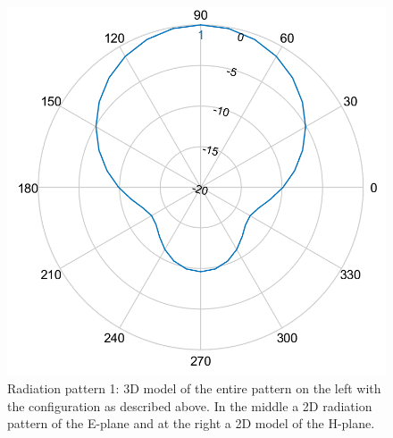 \begin{figure}[!htb]
  \includegraphics[width=\linewidth]{../images/pattern2/hp.png}
\endminipage
  \caption{Radiation pattern 1: 3D model of the entire pattern on the left with the configuration as described above. In the middle a 2D radiation pattern of the E-plane and at the right a 2D model of the H-plane.}
  \label{radpattern2}
\end{figure}

